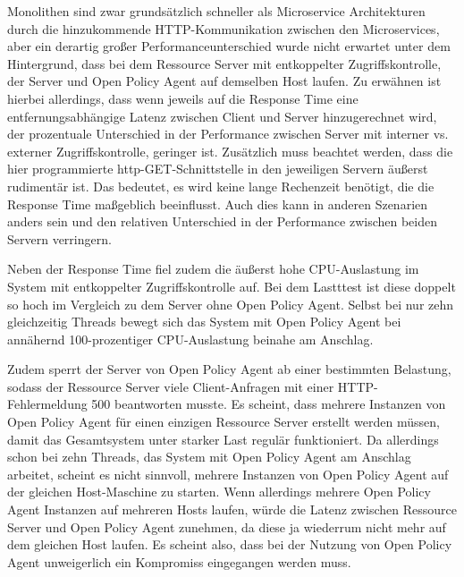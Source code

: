 Monolithen sind zwar grundsätzlich schneller als Microservice Architekturen durch die hinzukommende HTTP-Kommunikation zwischen den Microservices, aber ein derartig großer Performanceunterschied wurde nicht erwartet unter dem Hintergrund, dass bei dem Ressource Server mit entkoppelter Zugriffskontrolle, der Server und Open Policy Agent auf demselben Host laufen. Zu erwähnen ist hierbei allerdings, dass wenn jeweils auf die Response Time eine entfernungsabhängige Latenz zwischen Client und Server hinzugerechnet wird, der prozentuale Unterschied in der Performance zwischen Server mit interner vs. externer Zugriffskontrolle, geringer ist. Zusätzlich muss beachtet werden, dass die hier programmierte http-GET-Schnittstelle in den jeweiligen Servern äußerst rudimentär ist. Das bedeutet, es wird keine lange Rechenzeit benötigt, die die Response Time maßgeblich beeinflusst. Auch dies kann in anderen Szenarien anders sein und den relativen Unterschied in der Performance zwischen beiden Servern verringern.\smallskip

Neben der Response Time fiel zudem die äußerst hohe CPU-Auslastung im System mit entkoppelter Zugriffskontrolle auf. Bei dem Lastttest ist diese doppelt so hoch im Vergleich zu dem Server ohne Open Policy Agent. Selbst bei nur zehn gleichzeitig Threads bewegt sich das System mit Open Policy Agent bei annähernd 100-prozentiger CPU-Auslastung beinahe am Anschlag.\smallskip

Zudem sperrt der Server von Open Policy Agent ab einer bestimmten Belastung, sodass der Ressource Server viele Client-Anfragen mit einer HTTP-Fehlermeldung 500 beantworten musste. Es scheint, dass mehrere Instanzen von Open Policy Agent für einen einzigen Ressource Server erstellt werden müssen, damit das Gesamtsystem unter starker Last regulär funktioniert. Da allerdings schon bei zehn Threads, das System mit Open Policy Agent am Anschlag arbeitet, scheint es nicht sinnvoll, mehrere Instanzen von Open Policy Agent auf der gleichen Host-Maschine zu starten. Wenn allerdings mehrere Open Policy Agent Instanzen auf mehreren Hosts laufen, würde die Latenz zwischen Ressource Server und Open Policy Agent zunehmen, da diese ja wiederrum nicht mehr auf dem gleichen Host laufen. Es scheint also, dass bei der Nutzung von Open Policy Agent unweigerlich ein Kompromiss eingegangen werden muss. 
